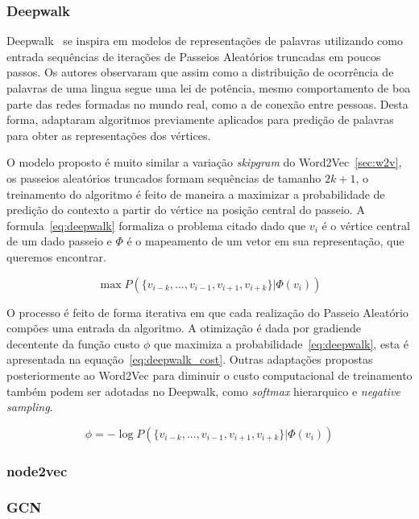 \subsubsection{Deepwalk}

Deepwalk~\cite{perozzi14} se inspira em modelos de representações de palavras
utilizando como entrada sequências de iterações de Passeios Aleatórios truncadas
em poucos passos.
Os autores observaram que assim como a distribuição de ocorrência de palavras de
uma lingua segue uma lei de potência, mesmo comportamento de boa parte das redes
formadas no mundo real, como a de conexão entre pessoas.
Desta forma, adaptaram algoritmos previamente aplicados para predição de
palavras para obter as representações dos vértices.

O modelo proposto é muito similar a variação \textit{skipgram} do
Word2Vec~\ref{sec:w2v}, os passeios aleatórios truncados formam sequências de
tamanho $2k + 1$, o treinamento do algoritmo é feito de maneira a maximizar a
probabilidade de predição do contexto a partir do vértice na posição central do
passeio.
A formula~\ref{eq:deepwalk} formaliza o problema citado dado que $v_i$ é o
vértice central de um dado passeio e $\Phi$ é o mapeamento de um vetor em sua
representação, que queremos encontrar.

\begin{equation} \label{eq:deepwalk}
    \operatorname{max} P(\{v_{i-k},..., v_{i-1},v_{i+1},v_{i+k}\}|\Phi(v_i))
\end{equation}

O processo é feito de forma iterativa em que cada realização do Passeio
Aleatório compões uma entrada da algoritmo.
A otimização é dada por gradiende decentente da função custo $\phi$ que maximiza
a probabilidade~\ref{eq:deepwalk}, esta é apresentada na
equação~\ref{eq:deepwalk_cost}.
Outras adaptações propostas posteriormente ao Word2Vec para diminuir o custo
computacional de treinamento também podem ser adotadas no Deepwalk, como
\textit{softmax} hierarquico e \textit{negative sampling}.

\begin{equation} \label{eq:deepwalk_cost}
    \phi = -\log P(\{v_{i-k},..., v_{i-1},v_{i+1},v_{i+k}\}|\Phi(v_i))
\end{equation}

\subsubsection{node2vec}

\subsubsection{GCN}
